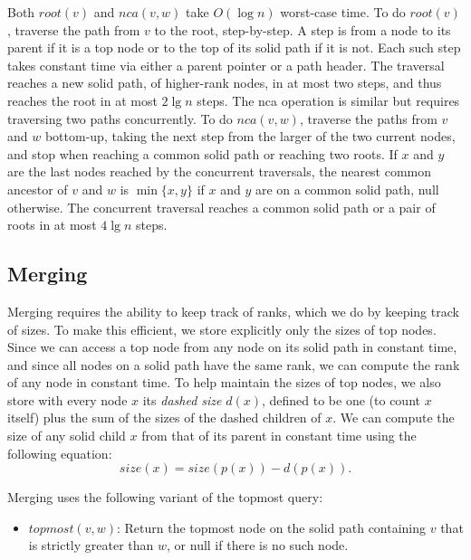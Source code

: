 \documentclass[twoside,leqno,twocolumn]{article}
\newcommand{\size}{\mathit{size}}
\newcommand{\nca}{\mathit{nca}}
\newcommand{\rootn}{\mathit{root}}
\begin{document}
Both $\rootn(v)$ and $\nca(v, w)$ take $O(\log n)$ worst-case time.  To do $\rootn(v)$, traverse the path from $v$ to the root, step-by-step.  A step is from a node to its parent if it is a top node or to the top of its solid path if it is not. Each such step takes constant time via either a parent pointer or a path header.  The traversal reaches a new solid path, of higher-rank nodes, in at most two steps, and thus reaches the root in at most $2\lg n$ steps.  The nca operation is similar but requires traversing two paths concurrently.  To do $\nca(v, w)$, traverse the paths from $v$ and $w$ bottom-up, taking the next step from the larger of the two current nodes, and stop when reaching a common solid path or reaching two roots.  If $x$ and $y$ are the last nodes reached by the concurrent traversals, the nearest common ancestor of $v$ and $w$ is $\min \{x, y\}$ if $x$ and $y$ are on a common solid path, null otherwise.  The concurrent traversal reaches a common solid path or a pair of roots in at most $4\lg n$ steps.


\subsection{Merging}
\label{sec:merge}

Merging requires the ability to keep track of ranks, which we do by keeping track of sizes.  To make this efficient, we store explicitly
only the sizes of top nodes.  Since we can access a top node from any node on its solid path in constant time, and since all nodes on a solid path have the same rank, we can compute the rank of any node in constant time.  To help maintain the sizes of top nodes, we also store with every node $x$ its \emph{dashed size} $d(x)$, defined to be one (to count $x$ itself) plus the sum of the sizes of the dashed children of $x$. We can compute the size of any solid child $x$ from that of its parent in constant time using the following equation:
\begin{equation}
\label{eq:size}
\size(x) = \size(p(x)) - d(p(x)).
\end{equation}


Merging uses the following variant of the topmost query:

\begin{itemize}
\item $\mathit{topmost}(v, w)$: Return the topmost node on the solid path containing $v$ that is strictly greater than $w$, or null if there is no such node.
\end{itemize}
\end{document}
